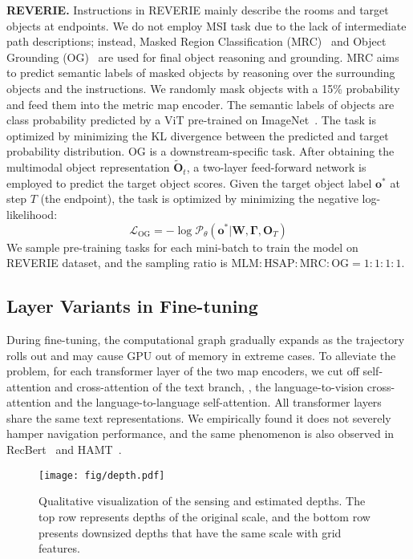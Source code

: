 \vspace{1mm}
\noindent\textbf{REVERIE.} Instructions in REVERIE mainly describe the rooms and target objects at endpoints. 
We do not employ MSI task due to the lack of intermediate path descriptions; instead, Masked Region Classification (MRC)~\cite{lu2019vilbert} and Object Grounding (OG)~\cite{lin2021scene} are used for final object reasoning and grounding. 
MRC aims to predict semantic labels of masked objects by reasoning over the surrounding objects and the instructions. We randomly mask objects with a 15\% probability and feed them into the metric map encoder.
The semantic labels of objects are class probability predicted by a ViT pre-trained on ImageNet~\cite{deng2009imagenet}. The task is optimized by minimizing the KL divergence between the predicted and target probability distribution. 
OG is a downstream-specific task. After obtaining the multimodal object representation $\widetilde{\mathbf{O}}_t$, a two-layer feed-forward network is employed to predict the target object scores. Given the target object label $\mathbf{o}^{*}$ at step $T$ (the endpoint), the task is optimized by minimizing the negative log-likelihood:
{\small
\begin{equation}\label{eq:og_loss}
\mathcal{L}_{\textrm{OG}} = -\log \mathcal{P}_{\theta} (\mathbf{o}^{*} | \mathbf{W}, \mathbf{\Gamma}, \mathbf{O}_{T})   
\end{equation}
}We sample pre-training tasks for each mini-batch to train the model on REVERIE dataset, and the sampling ratio is $\textrm{MLM}:\textrm{HSAP}:\textrm{MRC}:\textrm{OG}=1:1:1:1$.

\subsection{Layer Variants in Fine-tuning}
During fine-tuning, the computational graph gradually expands as the trajectory rolls out and may cause GPU out of memory in extreme cases.  
To alleviate the problem, for each transformer layer of the two map encoders, we cut off self-attention and cross-attention of the text branch, \ie, the language-to-vision cross-attention and the language-to-language self-attention. 
All transformer layers share the same text representations. We empirically found it does not severely hamper navigation performance, and the same phenomenon is also observed in RecBert~\cite{hong2021vln} and HAMT~\cite{chen2021history}.

\begin{figure*}[h]
\vspace{-3mm}
\centering
\texttt{[image: fig/depth.pdf]}
\vspace{-3mm}
\caption{
Qualitative visualization of the sensing and estimated depths. The top row represents depths of the original scale, and the bottom row presents downsized depths that have the same scale with grid features.
}\label{fig:depth}
\vspace{-3mm}
\end{figure*}


